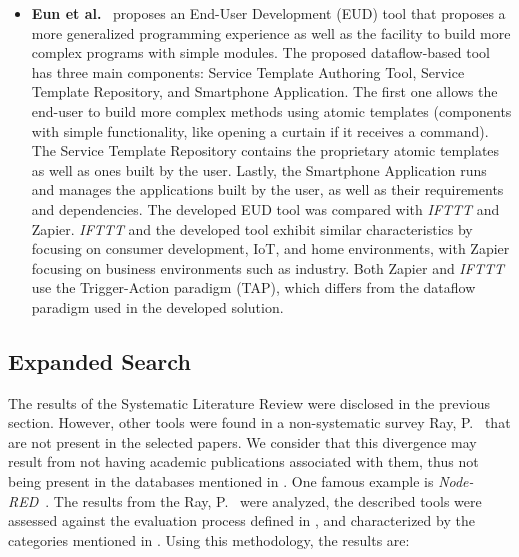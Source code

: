 \begin{itemize}
\item\textbf{Eun et al.}~\cite{eud_platform} proposes an End-User Development (EUD) tool that proposes a more generalized programming experience as well as the facility to build more complex programs with simple modules. The proposed dataflow-based tool has three main components: Service Template Authoring Tool, Service Template Repository, and Smartphone Application. The first one allows the end-user to build more complex methods using atomic templates (components with simple functionality, like opening a curtain if it receives a command). The Service Template Repository contains the proprietary atomic templates as well as ones built by the user. Lastly, the Smartphone Application runs and manages the applications built by the user, as well as their requirements and dependencies. The developed EUD tool was compared with \textit{IFTTT} and Zapier. \textit{IFTTT} and the developed tool exhibit similar characteristics by focusing on consumer development, IoT, and home environments, with Zapier focusing on business environments such as industry. Both Zapier and \textit{IFTTT} use the Trigger-Action paradigm (TAP), which differs from the dataflow paradigm used in the developed solution.
\end{itemize}

\subsection{Expanded Search}\label{sec:slr_expanded_research}

The results of the Systematic Literature Review were disclosed in the previous section. However, other tools were found in a non-systematic survey Ray, P.~\cite{survey_vpl_iot} that are not present in the selected papers. We consider that this divergence may result from not having academic publications associated with them, thus not being present in the databases mentioned in . One famous example is \textit{Node-RED}~\cite{node_red}. The results from the Ray, P.~\cite{survey_vpl_iot} were analyzed, the described tools were assessed against the evaluation process defined in , and characterized by the categories mentioned in . Using this methodology, the results are:

